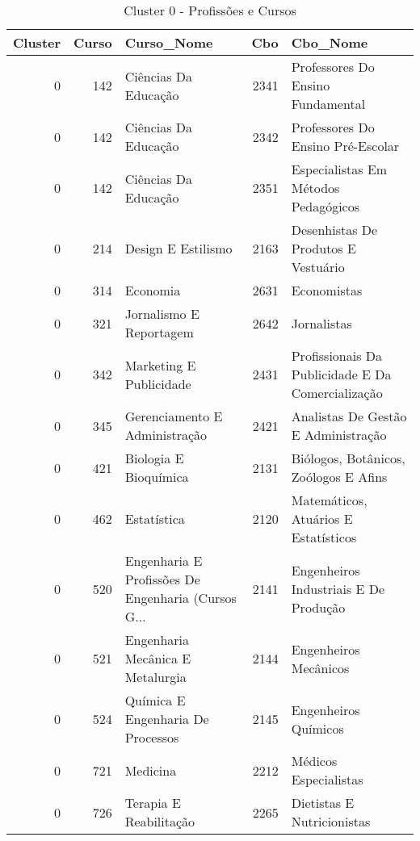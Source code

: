 \begin{table}
\centering
\caption{Cluster 0 - Profissões e Cursos }
\label{tab:Profissoes_Cluster0}
\begin{tabular}{rrlrl}
\toprule
 Cluster &  Curso &                                         Curso\_Nome &  Cbo &                                          Cbo\_Nome \\
\midrule
       0 &    142 &                               Ciências Da Educação & 2341 &                 Professores Do Ensino Fundamental \\
       0 &    142 &                               Ciências Da Educação & 2342 &                 Professores Do Ensino Pré-Escolar \\
       0 &    142 &                               Ciências Da Educação & 2351 &              Especialistas Em Métodos Pedagógicos \\
       0 &    214 &                                 Design E Estilismo & 2163 &              Desenhistas De Produtos E  Vestuário \\
       0 &    314 &                                           Economia & 2631 &                                       Economistas \\
       0 &    321 &                            Jornalismo E Reportagem & 2642 &                                       Jornalistas \\
       0 &    342 &                            Marketing E Publicidade & 2431 & Profissionais Da Publicidade E Da Comercialização \\
       0 &    345 &                      Gerenciamento E Administração & 2421 &               Analistas De Gestão E Administração \\
       0 &    421 &                              Biologia E Bioquímica & 2131 &             Biólogos, Botânicos, Zoólogos E Afins \\
       0 &    462 &                                        Estatística & 2120 &              Matemáticos, Atuários E Estatísticos \\
       0 &    520 & Engenharia E Profissões De Engenharia (Cursos G... & 2141 &             Engenheiros Industriais E De Produção \\
       0 &    521 &                   Engenharia Mecânica E Metalurgia & 2144 &                             Engenheiros Mecânicos \\
       0 &    524 &                  Química E Engenharia De Processos & 2145 &                              Engenheiros Químicos \\
       0 &    721 &                                           Medicina & 2212 &                             Médicos Especialistas \\
       0 &    726 &                             Terapia E Reabilitação & 2265 &                        Dietistas E Nutricionistas \\
\bottomrule
\end{tabular}
\end{table}
